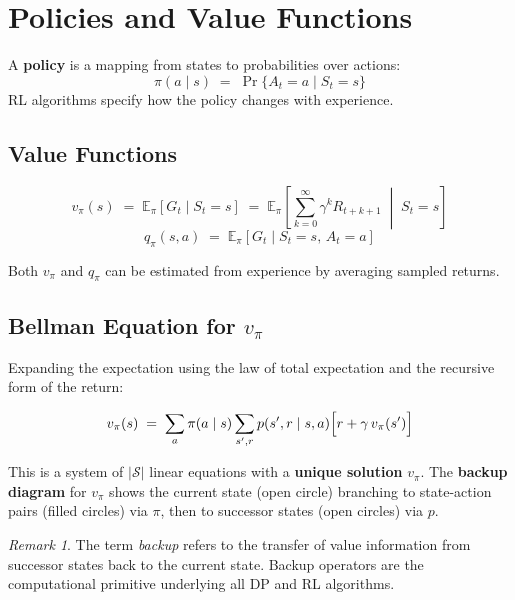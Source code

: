 \documentclass[11pt,a4paper]{article}
\theoremstyle{definition}
\theoremstyle{plain}
\theoremstyle{remark}
\newtheorem*{remark}{Remark}
\begin{document}
\section{Policies and Value Functions}

A \textbf{policy} is a mapping from states to probabilities over actions:
\[
    \pi(a \mid s) \;=\; \Pr\{A_t = a \mid S_t = s\}
\]
RL algorithms specify how the policy changes with experience.

\subsection{Value Functions}

\begin{tcolorbox}[colback=blue!5!white, colframe=blue!60!black, title={State-Value and Action-Value Functions}]
\[
    v_\pi(s) \;=\; \mathbb{E}_\pi\!\left[G_t \mid S_t = s\right]
    \;=\; \mathbb{E}_\pi\!\left[\sum_{k=0}^{\infty} \gamma^k R_{t+k+1} \;\middle|\; S_t = s\right]
\]
\[
    q_\pi(s, a) \;=\; \mathbb{E}_\pi\!\left[G_t \mid S_t = s,\, A_t = a\right]
\]
\end{tcolorbox}

Both $v_\pi$ and $q_\pi$ can be estimated from experience by averaging sampled returns.

\subsection{Bellman Equation for $v_\pi$}

Expanding the expectation using the law of total expectation and the recursive form of the return:

\begin{tcolorbox}[colback=green!5!white, colframe=green!60!black, title={Bellman Expectation Equation}]
\[
    v_\pi(s) \;=\; \sum_a \pi(a \mid s) \sum_{s', r} p(s', r \mid s, a)
    \Bigl[r + \gamma\, v_\pi(s')\Bigr]
\]
\end{tcolorbox}

This is a system of $|\mathcal{S}|$ linear equations with a \textbf{unique solution} $v_\pi$. The \textbf{backup diagram} for $v_\pi$ shows the current state (open circle) branching to state-action pairs (filled circles) via $\pi$, then to successor states (open circles) via $p$.

\begin{remark}
The term \emph{backup} refers to the transfer of value information from successor states back to the current state. Backup operators are the computational primitive underlying all DP and RL algorithms.
\end{remark}
\end{document}
